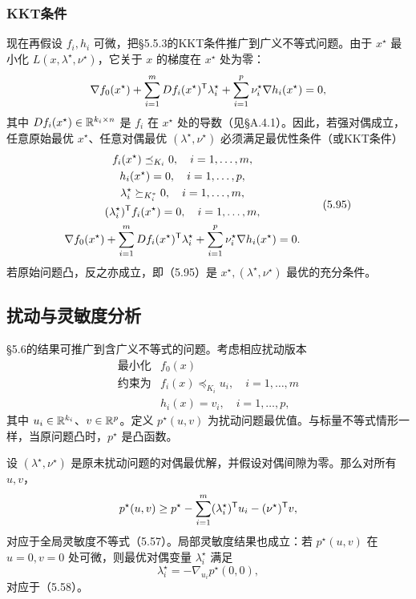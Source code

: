 \subsubsection*{KKT条件}
现在再假设 $f_i,h_i$ 可微，把§5.5.3的KKT条件推广到广义不等式问题。由于 $x^\star$ 最小化 $L(x,\lambda^\star,\nu^\star)$，它关于 $x$ 的梯度在 $x^\star$ 处为零：
\[
\nabla f_0(x^\star)+\sum_{i=1}^m Df_i(x^\star)^\mathsf T\lambda_i^\star
+\sum_{i=1}^p\nu_i^\star\nabla h_i(x^\star)=0,
\]
其中 $Df_i(x^\star)\in\mathbb R^{k_i\times n}$ 是 $f_i$ 在 $x^\star$ 处的导数（见§A.4.1）。因此，若强对偶成立，任意原始最优 $x^\star$、任意对偶最优 $(\lambda^\star,\nu^\star)$ 必须满足最优性条件（或KKT条件）
\begin{equation}
\begin{gathered}
f_i(x^\star)\preceq_{K_i}0,\quad i=1,\ldots,m,\\
h_i(x^\star)=0,\quad i=1,\ldots,p,\\
\lambda_i^\star\succeq_{K_i^*}0,\quad i=1,\ldots,m,\\
(\lambda_i^\star)^\mathsf T f_i(x^\star)=0,\quad i=1,\ldots,m,\\
\nabla f_0(x^\star)+\sum_{i=1}^m Df_i(x^\star)^\mathsf T\lambda_i^\star
+\sum_{i=1}^p\nu_i^\star\nabla h_i(x^\star)=0.
\end{gathered}\tag{5.95}
\end{equation}
若原始问题凸，反之亦成立，即（5.95）是 $x^\star,(\lambda^\star,\nu^\star)$ 最优的充分条件。

\subsection{扰动与灵敏度分析}
§5.6的结果可推广到含广义不等式的问题。考虑相应扰动版本
\[
\begin{array}{ll}\text{最小化}&f_0(x)\\
\text{约束为}&f_i(x)\preceq_{K_i}u_i,\quad i=1,\ldots,m\\
&h_i(x)=v_i,\quad i=1,\ldots,p,\end{array}
\]
其中 $u_i\in\mathbb R^{k_i}$、$v\in\mathbb R^p$。定义 $p^\star(u,v)$ 为扰动问题最优值。与标量不等式情形一样，当原问题凸时，$p^\star$ 是凸函数。

设 $(\lambda^\star,\nu^\star)$ 是原未扰动问题的对偶最优解，并假设对偶间隙为零。那么对所有 $u,v$，
\[
p^\star(u,v)\ge p^\star-\sum_{i=1}^m(\lambda_i^\star)^\mathsf T u_i-(\nu^\star)^\mathsf T v,
\]
对应于全局灵敏度不等式（5.57）。局部灵敏度结果也成立：若 $p^\star(u,v)$ 在 $u=0,v=0$ 处可微，则最优对偶变量 $\lambda_i^\star$ 满足
\[
\lambda_i^\star=-\nabla_{u_i}p^\star(0,0),
\]
对应于（5.58）。


